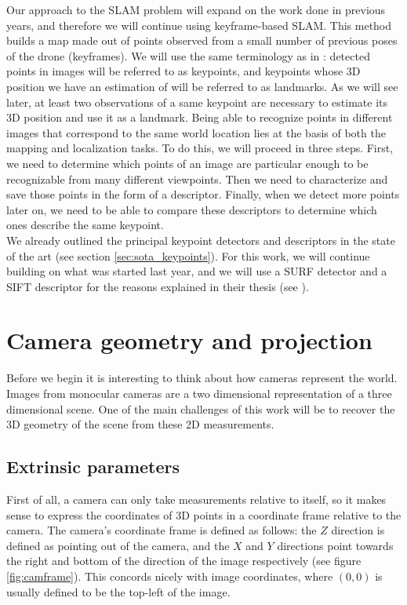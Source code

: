 Our approach to the SLAM problem will expand on the work done in previous years, and therefore we will continue using keyframe-based SLAM. This method builds a map made out of points observed from a small number of previous poses of the drone (keyframes). We will use the same terminology as in \cite{engel2011msc}: detected points in images will be referred to as keypoints, and keypoints whose 3D position we have an estimation of will be referred to as landmarks. As we will see later, at least two observations of a same keypoint are necessary to estimate its 3D position and use it as a landmark. Being able to recognize points in different images that correspond to the same world location lies at the basis of both the mapping and localization tasks. To do this, we will proceed in three steps. First, we need to determine which points of an image are particular enough to be recognizable from many different viewpoints. Then we need to characterize and save those points in the form of a descriptor. Finally, when we detect more points later on, we need to be able to compare these descriptors to determine which ones describe the same keypoint.\\
We already outlined the principal keypoint detectors and descriptors in the state of the art (see section \ref{sec:sota_keypoints}). For this work, we will continue building on what was started last year, and we will use a SURF detector and a SIFT descriptor for the reasons explained in their thesis (see  \cite{jacquesleclere}).

\section{Camera geometry and projection}
Before we begin it is interesting to think about how cameras represent the world. Images from monocular cameras are a two dimensional representation of a three dimensional scene. One of the main challenges of this work will be to recover the 3D geometry of the scene from these 2D measurements.

\subsection{Extrinsic parameters}
First of all, a camera can only take measurements relative to itself, so it makes sense to express the coordinates of 3D points in a coordinate frame relative to the camera. The camera's coordinate frame is defined as follows: the $Z$ direction is defined as pointing out of the camera, and the $X$ and $Y$ directions point towards the right and bottom of the direction of the image respectively (see figure \ref{fig:camframe}). This concords nicely with image coordinates, where $(0,0)$ is usually defined to be the top-left of the image.

